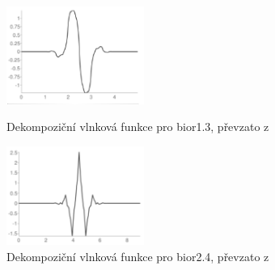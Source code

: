\begin{figure}[!htbp]
  \begin{minipage}[b]{0.5\linewidth}
    \centering
    \includegraphics[width=170px]{obrazky-figures/bior13wavelet.PNG}
    \caption{Dekompoziční vlnková funkce pro bior1.3, převzato z \cite{PyWaveletsBrowser}}
  \end{minipage}
  \hspace{0.5cm}
  \begin{minipage}[b]{0.5\linewidth}
    \centering
    \includegraphics[width=170px]{obrazky-figures/bior24wavelet.PNG}
    \caption{Dekompoziční vlnková funkce pro bior2.4, převzato z \cite{PyWaveletsBrowser}}
  \end{minipage}
\end{figure}

